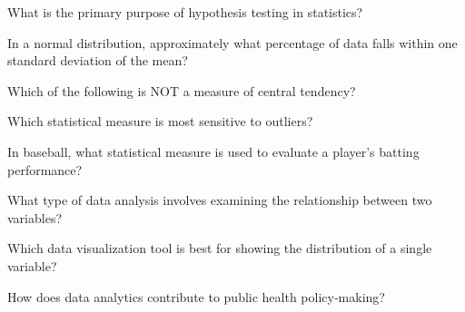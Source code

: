 
\begin{enhancedmcq}{What is the primary purpose of hypothesis testing in statistics?}
\end{enhancedmcq}

\begin{enhancedmcq}{In a normal distribution, approximately what percentage of data falls within one standard deviation of the mean?}
\end{enhancedmcq}

\begin{enhancedmcq}{Which of the following is NOT a measure of central tendency?}
\end{enhancedmcq}

\begin{enhancedmcq}{Which statistical measure is most sensitive to outliers?}
\end{enhancedmcq}

\begin{enhancedmcq}{In baseball, what statistical measure is used to evaluate a player's batting performance?}
\end{enhancedmcq}

\begin{enhancedmcq}{What type of data analysis involves examining the relationship between two variables?}
\end{enhancedmcq}

\begin{enhancedmcq}{Which data visualization tool is best for showing the distribution of a single variable?}
\end{enhancedmcq}

\begin{enhancedmcq}{How does data analytics contribute to public health policy‑making?}
\end{enhancedmcq}

